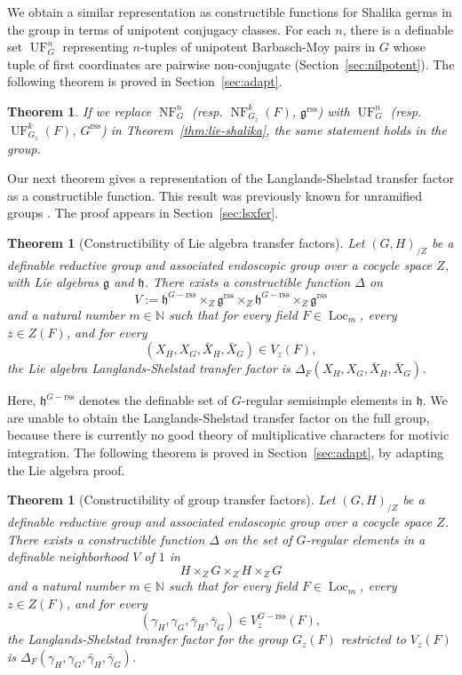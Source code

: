\documentclass[12pt]{amsart}
\newcommand{\op}[1]{\operatorname{#1}}
\newcommand{\ring}[1]{{\mathbb #1}}
\def\NF{\op{NF}}
\def\UF{\op{UF}}
\def\Y{\Upsilon}
\newcommand{\fg}{\mathfrak{g}}
\newcommand{\fh}{\mathfrak{h}}
\newcommand{\reg}{\mathrm{rss}}
\theoremstyle{plain}
\newtheorem{theorem}[thm]{Theorem}
\theoremstyle{definition}
\begin{document}
We obtain a similar representation as constructible functions for
Shalika germs in the group in terms of unipotent conjugacy classes.
For each $n$, there is a definable set $\UF^n_G$ representing
$n$-tuples of unipotent Barbasch-Moy pairs in $G$ whose tuple of first
coordinates are pairwise non-conjugate (Section~\ref{sec:nilpotent}).
The following theorem is proved in Section~\ref{sec:adapt}.


\begin{theorem} If we replace $\NF^n_G$ (resp. $\NF^{k}_{G_z}(F)$,
  $\fg^\reg$) with $\UF^n_{G}$ (resp. $\UF^{k}_{G_z}(F)$, $G^\reg$)
  in Theorem~\ref{thm:lie-shalika}, the same statement holds in the
  group.
\end{theorem}

Our next theorem gives a representation of the Langlands-Shelstad
transfer factor as a constructible function.  This result was
previously known for unramified groups \cite{CHL}.  The proof appears
in Section~\ref{sec:lsxfer}. 

\begin{theorem}[Constructibility of Lie algebra transfer
  factors]\label{thm:xfer-factor} 
  Let $(G,H)_{/Z}$ be a definable reductive group and associated
  endoscopic group over a cocycle space $Z$, with Lie algebras $\fg$
  and $\fh$.  There exists a constructible function $\Delta$ on
\begin{equation}\label{eqn:delta-domain}
V := \fh^{G-\reg}\times_Z
  \fg^\reg\times_Z
\fh^{G-\reg}\times_Z
  \fg^\reg
\end{equation}
and a natural number $m\in \ring{N}$ such that for every field $F\in
\op{Loc}_{m}$, every $z\in Z(F)$, and for every 
\[
(X_H,X_G,\bar X_H,\bar X_G)\in
V_z(F),\]  
the Lie algebra Langlands-Shelstad transfer factor is
$\Delta_F(X_H,X_G,\bar X_H,\bar X_G)$.
\end{theorem}

Here, $\fh^{G-\reg}$ denotes the definable set of $G$-regular
semisimple elements in $\fh$.  We are unable to obtain the
Langlands-Shelstad transfer factor on the full group, because there is
currently no good theory of multiplicative characters for motivic
integration. The following theorem is proved in
Section~\ref{sec:adapt}, by adapting the Lie algebra proof.

\begin{theorem}[Constructibility of group transfer factors]
\label{thm:gtf} 
Let
  $(G,H)_{/Z}$ be a definable reductive group and associated
  endoscopic group over a cocycle space $Z$.  
  There exists a constructible
  function $\Delta$ on the set of $G$-regular elements in
   a definable neighborhood $V$ of $1$ in
\[
H\times_Z  G\times_Z H\times_Z   G
\] 
and a natural number $m\in \ring{N}$ such that for every field $F\in
\op{Loc}_{m}$, every $z\in Z(F)$, and for every 
\[
(\gamma_H,\gamma_G,\bar \gamma_H,\bar \gamma_G)\in V^{G-\reg}_z(F),\] the
Langlands-Shelstad transfer factor for the group $G_z(F)$ restricted to
$V_z(F)$ is $\Delta_F(\gamma_H,\gamma_G,\bar \gamma_H,\bar
\gamma_G)$.
\end{theorem}
\end{document}
